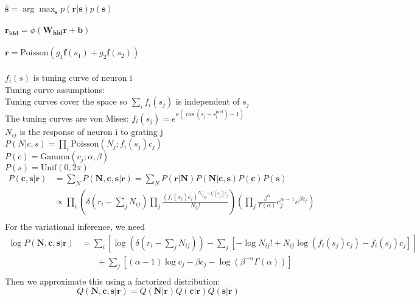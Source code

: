 \documentclass[12pt]{article}
\begin{document}
$\hat{\mathbf{s}} = \arg\max_\mathbf{s} p(\mathbf{r|s}) p(\mathbf{s})$
\\
\\
$\mathbf{r_\text{hid}} = \phi (\mathbf{W_{\text{hid}}r + b})$
\\
\\
$\mathbf{r} = \text{Poisson} (g_1\mathbf{f} (s_1) + g_2\mathbf{f} (s_2))$
\\
\\
$f_i(s)$ is tuning curve of neuron i\\
Tuning curve assumptions:\\
Tuning curves cover the space so $\sum_i f_i(s_j)$ is independent of $s_j$\\
The tuning curves are von Mises: $f_i(s_j) = e^{\kappa(\cos(s_j - s_i^{\text{pref}}) - 1)}$\\
$N_{ij}$ is the response of neuron i to grating j\\
$P(N|c, s) = \prod_i \text{Poisson}(N_{j}; f_i(s_j)c_j)$\\
$P(c) = \text{Gamma}(c_j; \alpha, \beta)$\\
$P(s) = \text{Unif}(0, 2\pi)$\\
\begin{equation}
\begin{aligned}
P(\mathbf{c, s|r}) & = \sum_N P(\mathbf{N, c, s|r}) = \sum_N P(\mathbf{r|N}) P(\mathbf{N|c, s}) P(\mathbf{c}) P(\mathbf{s})\\
&\propto \prod_i (\delta(r_i - \sum_j N_{ij}) \prod_j\frac{(f_i(s_j)c_j)^{N_{ij}} e^{-f_i(s_j) c_j}}{N_{ij}!}) (\prod_j \frac{\beta^{\alpha}}{\Gamma(\alpha)} c_j^{\alpha - 1}e^{\beta c_j})\\
\end{aligned}
\end{equation}
For the variational inference, we need\\
\begin{equation}
\begin{aligned}
\log P(\mathbf{N, c, s| r}) &= \sum_i [\log(\delta(r_i - \sum_j N_{ij})) - \sum_j [- \log N_{ij}! + N_{ij} \log(f_i(s_j)c_j) - f_i(s_j) c_j]]\\
& \phantom{{}=1} + \sum_j[(\alpha - 1) \log c_j - \beta c_j - \log (\beta^{- \alpha} \Gamma (\alpha))]\\
\end{aligned}
\end{equation}
Then we approximate this using a factorized distribution:\\
\begin{equation}
Q(\mathbf{N, c, s|r}) = Q(\mathbf{N|r}) Q(\mathbf{c|r}) Q(\mathbf{s|r})
\end{equation}
\end{document}
